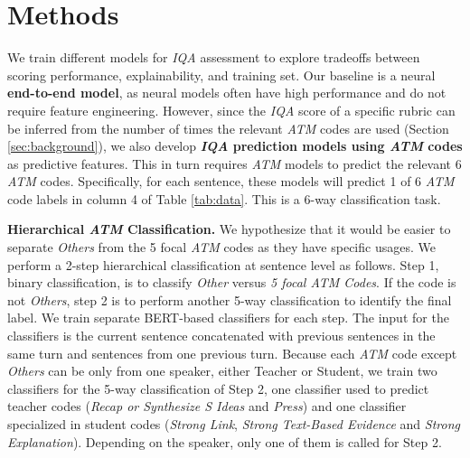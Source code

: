 \documentclass[runningheads]{llncs}
\begin{document}
\section{Methods}
We  train different %
models for \textit{IQA}  assessment to explore tradeoffs between scoring performance,  explainability, and  training set.  Our baseline is a neural {\bf  end-to-end %
model}, as neural models
often have high %
performance and do not require  feature engineering. However, since
the \textit{IQA}  score of a specific rubric can be inferred from the number of times the relevant \textit{ATM} codes are used (Section \ref{sec:background}),
we also develop \textbf{\textit{IQA} prediction models using \textit{ATM} codes} as predictive features.  This in turn requires 
 \textit{ATM} models to predict the 
 relevant 6 \textit{ATM} codes.  Specifically, for each sentence, these  models will predict 1 of 6 \textit{ATM} code labels in column 4 of Table \ref{tab:data}.
 This is a 6-way classification task.  


\textbf{Hierarchical \textit{ATM} Classification.}
We hypothesize that it would be easier to separate \textit{Others} from the 5 focal \textit{ATM} codes as they have specific usages.
We perform a 2-step hierarchical classification at sentence level as follows.
Step 1, binary classification, is to classify \textit{Other} versus \textit{5 focal ATM Codes}. 
If the code is not \textit{Others}, step 2 is to perform another 5-way classification to identify the final label. 
We train separate BERT-based classifiers for each step. The input for the classifiers is the current sentence concatenated with previous sentences in the same turn and sentences from one previous turn. Because each \textit{ATM} code except \textit{Others} can be only from one speaker, either Teacher or Student, we train two classifiers for the 5-way classification  of Step 2, one classifier used to predict teacher codes (\textit{Recap or Synthesize S Ideas} and \textit{Press}) and one classifier specialized in student codes (\textit{Strong Link}, \textit{Strong Text-Based Evidence} and \textit{Strong Explanation}). Depending on  the speaker, only one of them is called for Step 2.
\end{document}
